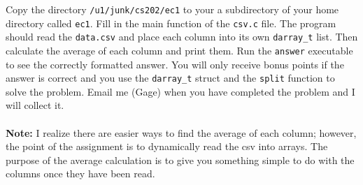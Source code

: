 \documentclass[12pt]{article}
\begin{document}
\noindent
Copy the directory \texttt{/u1/junk/cs202/ec1} to your a subdirectory of your
home directory called \texttt{ec1}. Fill in the main function of the
\texttt{csv.c} file. The program should read the \texttt{data.csv} and place
each column into its own \texttt{darray\_t} list. Then calculate the average of
each column and print them. Run the \texttt{answer} executable to see
the correctly formatted answer. You will only receive bonus points if the
answer is correct and you use the \texttt{darray\_t} struct and the \texttt{split}
function to solve the problem. Email me (Gage) when you have completed the problem and
I will collect it.\\\\
\noindent
\textbf{Note:} I realize there are easier ways to find the average of each
column; however, the point of the assignment is to dynamically read the csv
into arrays. The purpose of the average calculation is to give you something
simple to do with the columns once they have been read.
\end{document}
